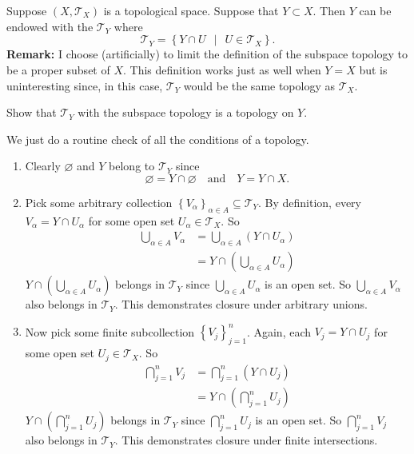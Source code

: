 \begin{dfn}
    Suppose \( \left( X, \mathscr{T}_{X} \right) \) is a topological space. Suppose that \( Y \subset X \). Then \( Y \) can be endowed with the  \( \mathscr{T}_{Y} \) where 
    \[ \mathscr{T}_{Y} = \left\{ Y \cap U \ \ \middle| \ \ U \in \mathscr{T}_{X} \right\}. \]
    \textbf{Remark:} I choose (artificially) to limit the definition of the subspace topology to be a proper subset of \( X \). This definition works just as well when \( Y =X \) but is uninteresting since, in this case, \( \mathscr{T}_{Y} \) would be the same topology as \( \mathscr{T}_{X} \).
\end{dfn}

\begin{exercise}
    Show that \( \mathscr{T}_{Y} \) with the subspace topology is a topology on \( Y \).
\end{exercise}
\begin{solution}
    We just do a routine check of all the conditions of a topology. 
    \begin{enumerate}[label=\textbf{\roman*)}]
        \item Clearly \( \varnothing \) and \( Y \) belong to \( \mathscr{T}_{Y} \) since 
        \[ \varnothing = Y \cap \varnothing \quad  \text{and} \quad Y = Y \cap X .\]
        \item Pick some arbitrary collection \( \left\{ V_{\alpha} \right\}_{\alpha \in A} \subseteq \mathscr{T}_{Y} \). By definition, every \( V_{\alpha} = Y \cap U_{\alpha} \) for some open set \( U_{\alpha} \in \mathscr{T}_{X} \). So 
        \begin{align*}
            \bigcup_{\alpha \in A} V_{\alpha} &= \bigcup_{\alpha \in A} \left( Y \cap U_{\alpha} \right) \\
            &= Y \cap \left( \bigcup_{\alpha \in A} U_{\alpha} \right)
        \end{align*}
        \( Y \cap \left( \bigcup_{\alpha \in A} U_{\alpha} \right)  \) belongs in \( \mathscr{T}_{Y} \) since \( \bigcup_{\alpha \in A} U_{\alpha} \) is an open set. So \( \bigcup_{\alpha \in A} V_{\alpha} \) also belongs in \( \mathscr{T}_{Y} \). This demonstrates closure under arbitrary unions. 
        \item Now pick some finite subcollection \( \left\{ V_{j} \right\}_{j=1}^{n} \). Again, each \( V_{j} = Y \cap U_{j} \) for some open set \( U_{j} \in \mathscr{T}_{X} \). So 
        \begin{align*}
            \bigcap_{j=1}^{n} V_{j} &= \bigcap_{j=1}^{n} \left( Y \cap U_{j} \right) \\
            &= Y \cap \left( \bigcap_{j=1}^{n} U_{j} \right)
        \end{align*}
        \(  Y \cap \left( \bigcap_{j=1}^{n} U_{j} \right) \) belongs in \( \mathscr{T}_{Y} \) since \( \bigcap_{j=1}^{n} U_{j} \) is an open set. So \( \bigcap_{j=1}^{n} V_{j} \) also belongs in \( \mathscr{T}_{Y} \). This demonstrates closure under finite intersections. 
    \end{enumerate}
\end{solution}

